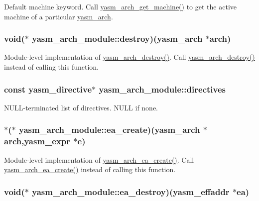 Default machine keyword. Call \hyperlink{arch_8h_a140c8c687d8dfcde94aafc3338ec3bee}{yasm\-\_\-arch\-\_\-get\-\_\-machine()} to get the active machine of a particular \hyperlink{coretype_8h_a8e0de61d73c940f0e7b6ef12e0dc1c70}{yasm\-\_\-arch}. \hypertarget{structyasm__arch__module_a60d0078567b6c0a25f3e9f29fb710d0b}{
\subsubsection[{destroy}]{\setlength{\rightskip}{0pt plus 5cm}void($\ast$ yasm\-\_\-arch\-\_\-module\-::destroy)({\bf yasm\-\_\-arch} $\ast$arch)}}\label{structyasm__arch__module_a60d0078567b6c0a25f3e9f29fb710d0b}
Module-\/level implementation of \hyperlink{arch_8h_aa8c55848aa8e698d5a1b1291d440fee4}{yasm\-\_\-arch\-\_\-destroy()}. Call \hyperlink{arch_8h_aa8c55848aa8e698d5a1b1291d440fee4}{yasm\-\_\-arch\-\_\-destroy()} instead of calling this function. \hypertarget{structyasm__arch__module_a4619ed342e98203bfc1edcdeb9eec65c}{
\subsubsection[{directives}]{\setlength{\rightskip}{0pt plus 5cm}const {\bf yasm\-\_\-directive}$\ast$ yasm\-\_\-arch\-\_\-module\-::directives}}\label{structyasm__arch__module_a4619ed342e98203bfc1edcdeb9eec65c}
N\-U\-L\-L-\/terminated list of directives. N\-U\-L\-L if none. \hypertarget{structyasm__arch__module_ac41bf595c524eed5dfebb16514eefad3}{
\subsubsection[{ea\-\_\-create}]{$\ast$($\ast$ yasm\-\_\-arch\-\_\-module\-::ea\-\_\-create)({\bf yasm\-\_\-arch} $\ast$arch,{\bf yasm\-\_\-expr} $\ast$e)}}\label{structyasm__arch__module_ac41bf595c524eed5dfebb16514eefad3}
Module-\/level implementation of \hyperlink{arch_8h_a6da9f655b142d8b112ae286277b6b1ca}{yasm\-\_\-arch\-\_\-ea\-\_\-create()}. Call \hyperlink{arch_8h_a6da9f655b142d8b112ae286277b6b1ca}{yasm\-\_\-arch\-\_\-ea\-\_\-create()} instead of calling this function. \hypertarget{structyasm__arch__module_acfe30289d9c3300986fe4f73c92ca644}{
\subsubsection[{ea\-\_\-destroy}]{\setlength{\rightskip}{0pt plus 5cm}void($\ast$ yasm\-\_\-arch\-\_\-module\-::ea\-\_\-destroy)({\bf yasm\-\_\-effaddr} $\ast$ea)}}\label{structyasm__arch__module_acfe30289d9c3300986fe4f73c92ca644}
